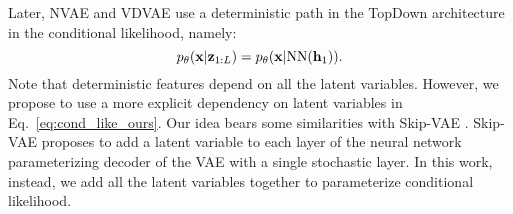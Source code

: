 Later, NVAE \citep{vahdat2020nvae} and VDVAE \citep{Child2020-ze} use a deterministic path in the TopDown architecture in the conditional likelihood, namely:
\begin{equation}\label{eq:cond_like_vdvae}
    p_{\theta}(\rvx|\rvz_{1:L}) = p_{\theta}(\rvx|\text{NN}(\rvh_1)).
\end{equation}
Note that deterministic features depend on all the latent variables. However, we propose to use a more explicit dependency on latent variables in Eq.~\ref{eq:cond_like_ours}. Our idea bears some similarities with Skip-VAE \citep{dieng2019avoiding}. Skip-VAE proposes to add a latent variable to each layer of the neural network parameterizing decoder of the VAE with a single stochastic layer. In this work, instead, we add all the latent variables together to parameterize conditional likelihood. 
